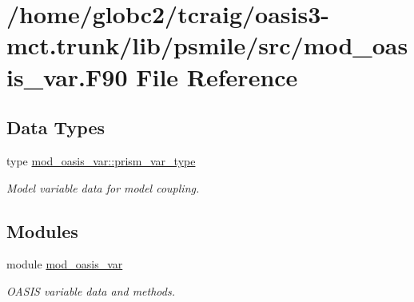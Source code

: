 \hypertarget{mod__oasis__var_8_f90}{}\section{/home/globc2/tcraig/oasis3-\/mct.trunk/lib/psmile/src/mod\+\_\+oasis\+\_\+var.F90 File Reference}
\label{mod__oasis__var_8_f90}
\subsection*{Data Types}
\begin{DoxyCompactItemize}
\item 
type \hyperlink{structmod__oasis__var_1_1prism__var__type}{mod\+\_\+oasis\+\_\+var\+::prism\+\_\+var\+\_\+type}
\begin{DoxyCompactList}\small\item\em Model variable data for model coupling. \end{DoxyCompactList}\end{DoxyCompactItemize}
\subsection*{Modules}
\begin{DoxyCompactItemize}
\item 
module \hyperlink{namespacemod__oasis__var}{mod\+\_\+oasis\+\_\+var}
\begin{DoxyCompactList}\small\item\em O\+A\+S\+IS variable data and methods. \end{DoxyCompactList}\end{DoxyCompactItemize}
